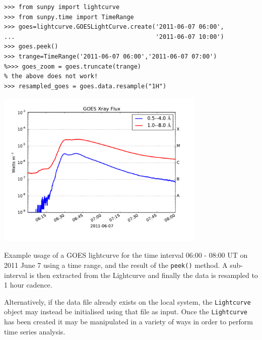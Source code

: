 \begin{listing}[H]
\begin{verbatim}
>>> from sunpy import lightcurve
>>> from sunpy.time import TimeRange
>>> goes=lightcurve.GOESLightCurve.create('2011-06-07 06:00',
...                                       '2011-06-07 10:00')
>>> goes.peek()
>>> trange=TimeRange('2011-06-07 06:00','2011-06-07 07:00')
%>>> goes_zoom = goes.truncate(trange)
% the above does not work!
>>> resampled_goes = goes.data.resample("1H")
\end{verbatim}
\begin{center}
\includegraphics[width=10cm]{goes_lightcurve.pdf}
\end{center}
\caption{Example usage of a GOES lightcurve for the time interval 06:00 - 08:00 UT on 
2011 June 7 using a time range, and the result of the \texttt{peek()} method.
A sub-interval is then extracted from the Lightcurve and finally the data is resampled
to 1 hour cadence.}
\label{code:goes_lc}
\end{listing}

Alternatively, if the data file already exists on the local system, the 
\texttt{Lightcurve} object may instead be initialised using that file as input.
Once the \texttt{Lightcurve} has been created it may be manipulated in 
a variety of ways in order to perform time series analysis. 